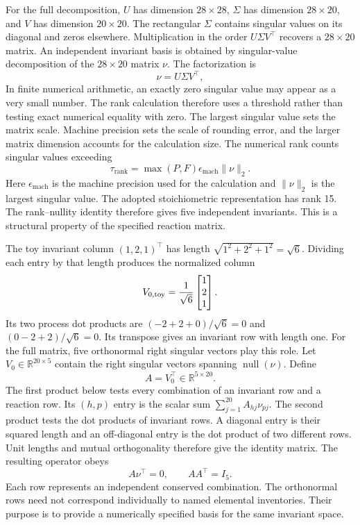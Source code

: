 For the full decomposition, $U$ has dimension $28\times28$, $\Sigma$ has dimension $28\times20$, and $V$ has dimension $20\times20$. The rectangular $\Sigma$ contains singular values on its diagonal and zeros elsewhere. Multiplication in the order $U\Sigma V^\top$ recovers a $28\times20$ matrix. An independent invariant basis is obtained by singular-value decomposition of the $28\times20$ matrix $\nu$. The factorization is
\begin{equation}
\nu=U\Sigma V^\top,
\label{eq:stoichiometric_svd}
\end{equation}
In finite numerical arithmetic, an exactly zero singular value may appear as a very small number. The rank calculation therefore uses a threshold rather than testing exact numerical equality with zero. The largest singular value sets the matrix scale. Machine precision sets the scale of rounding error, and the larger matrix dimension accounts for the calculation size. The numerical rank counts singular values exceeding
\begin{equation}
\tau_{\mathrm{rank}}=\max(P,F)\epsilon_{\mathrm{mach}}\|\nu\|_2.
\label{eq:stoichiometric_rank_threshold}
\end{equation}
Here $\epsilon_{\mathrm{mach}}$ is the machine precision used for the calculation and $\|\nu\|_2$ is the largest singular value. The adopted stoichiometric representation has rank 15. The rank--nullity identity therefore gives five independent invariants. This is a structural property of the specified reaction matrix.

The toy invariant column $(1,2,1)^\top$ has length $\sqrt{1^2+2^2+1^2}=\sqrt6$. Dividing each entry by that length produces the normalized column
\[
V_{0,\rm toy}=\frac1{\sqrt6}\begin{bmatrix}1\\2\\1\end{bmatrix}.
\]
Its two process dot products are $(-2+2+0)/\sqrt6=0$ and $(0-2+2)/\sqrt6=0$. Its transpose gives an invariant row with length one. For the full matrix, five orthonormal right singular vectors play this role. Let $V_0\in\mathbb{R}^{20\times5}$ contain the right singular vectors spanning $\operatorname{null}(\nu)$. Define
\begin{equation}
A=V_0^\top\in\mathbb{R}^{5\times20}.
\label{eq:invariant_basis_definition}
\end{equation}
The first product below tests every combination of an invariant row and a reaction row. Its $(h,p)$ entry is the scalar sum $\sum_{j=1}^{20}A_{hj}\nu_{pj}$. The second product tests the dot products of invariant rows. A diagonal entry is their squared length and an off-diagonal entry is the dot product of two different rows. Unit lengths and mutual orthogonality therefore give the identity matrix. The resulting operator obeys
\begin{equation}
A\nu^\top=0,\qquad AA^\top=I_5.
\label{eq:invariant_basis_properties}
\end{equation}
Each row represents an independent conserved combination. The orthonormal rows need not correspond individually to named elemental inventories. Their purpose is to provide a numerically specified basis for the same invariant space.

